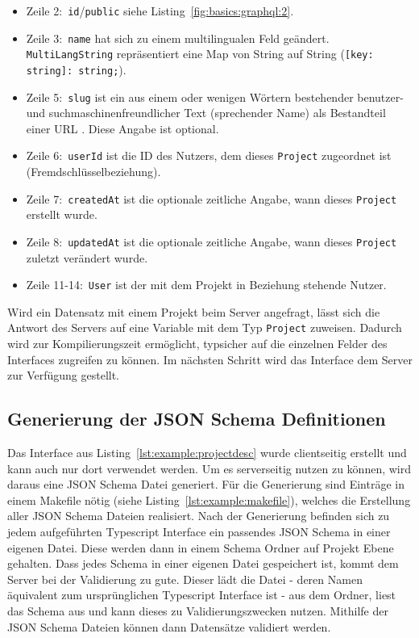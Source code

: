 \begin{itemize}
    \setlength\itemsep{-1em}
    \item Zeile 2:~\texttt{id}/\texttt{public} siehe Listing~\ref{fig:basics:graphql:2}.
    \item Zeile 3:~\texttt{name} hat sich zu einem multilingualen Feld geändert. \texttt{MultiLangString} repräsentiert eine Map von String auf String (\texttt{[key: string]: string;}).
    \item Zeile 5:~\texttt{slug} ist ein aus einem oder wenigen Wörtern bestehender benutzer- und suchmaschinenfreundlicher
    Text (sprechender Name) als Bestandteil einer URL \cite{slug-wikipedia}. Diese Angabe ist optional.
    \item Zeile 6:~\texttt{userId} ist die ID des Nutzers, dem dieses \texttt{Project} zugeordnet ist (Fremdschlüsselbeziehung).
    \item Zeile 7:~\texttt{createdAt} ist die optionale zeitliche Angabe, wann dieses \texttt{Project} erstellt wurde.
    \item Zeile 8:~\texttt{updatedAt} ist die optionale zeitliche Angabe, wann dieses \texttt{Project} zuletzt verändert wurde.
     \item Zeile 11-14:~\texttt{User} ist der mit dem Projekt in Beziehung stehende Nutzer.
\end{itemize}

Wird ein Datensatz mit einem Projekt beim Server angefragt, lässt sich die Antwort des Servers auf eine Variable mit dem Typ \texttt{Project} zuweisen.
Dadurch wird zur Kompilierungszeit ermöglicht, typsicher auf die einzelnen Felder des Interfaces zugreifen zu können.
Im nächsten Schritt wird das Interface dem Server zur Verfügung gestellt.

\subsection{Generierung der JSON Schema Definitionen}
\label{sec:requirements:example:schema}
Das Interface aus Listing~\ref{lst:example:projectdesc} wurde clientseitig erstellt und kann auch nur dort verwendet werden. Um es serverseitig nutzen zu können, wird daraus eine JSON Schema Datei generiert.
Für die Generierung sind Einträge in einem Makefile nötig (siehe Listing~\ref{lst:example:makefile}), welches die Erstellung aller JSON Schema Dateien realisiert. Nach der Generierung befinden sich zu jedem aufgeführten Typescript Interface ein passendes JSON Schema in einer eigenen Datei. Diese werden dann in einem Schema Ordner auf Projekt Ebene gehalten. Dass jedes Schema in einer eigenen Datei gespeichert ist, kommt dem Server bei der Validierung zu gute. 
Dieser lädt die Datei - deren Namen äquivalent zum ursprünglichen Typescript Interface ist - aus dem Ordner, liest das Schema aus und kann dieses zu Validierungszwecken nutzen.
Mithilfe der JSON Schema Dateien können dann Datensätze validiert werden.

